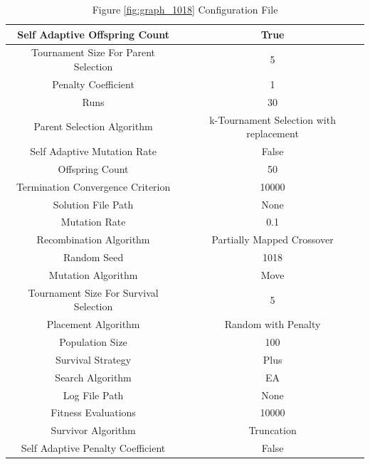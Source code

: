 \documentclass{standalone}
\begin{document}
\begin{table}[!htb]
	\centering
	\caption{Figure \ref{fig:graph_1018} Configuration File}
	\label{tab:graph_1018}
	\begin{tabular}{| c | c |}
		\hline
		Self Adaptive Offspring Count		& True		 \\
		\hline
		Tournament Size For Parent Selection		& 5		 \\
		\hline
		Penalty Coefficient		& 1		 \\
		\hline
		Runs		& 30		 \\
		\hline
		Parent Selection Algorithm		& k-Tournament Selection with replacement		 \\
		\hline
		Self Adaptive Mutation Rate		& False		 \\
		\hline
		Offspring Count		& 50		 \\
		\hline
		Termination Convergence Criterion		& 10000		 \\
		\hline
		Solution File Path		& None		 \\
		\hline
		Mutation Rate		& 0.1		 \\
		\hline
		Recombination Algorithm		& Partially Mapped Crossover		 \\
		\hline
		Random Seed		& 1018		 \\
		\hline
		Mutation Algorithm		& Move		 \\
		\hline
		Tournament Size For Survival Selection		& 5		 \\
		\hline
		Placement Algorithm		& Random with Penalty		 \\
		\hline
		Population Size		& 100		 \\
		\hline
		Survival Strategy		& Plus		 \\
		\hline
		Search Algorithm		& EA		 \\
		\hline
		Log File Path		& None		 \\
		\hline
		Fitness Evaluations		& 10000		 \\
		\hline
		Survivor Algorithm		& Truncation		 \\
		\hline
		Self Adaptive Penalty Coefficient		& False		 \\
		\hline
	\end{tabular}
\end{table}
\end{document}
